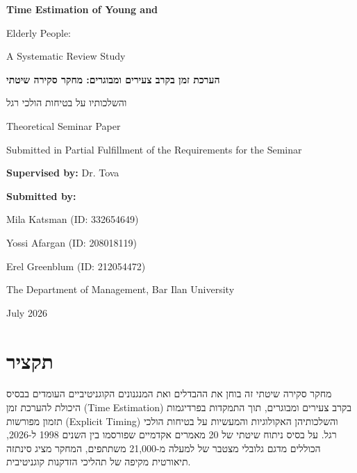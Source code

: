 \documentclass{custom_report}
\begin{document}
\begin{titlepage}
    \centering
    \vspace*{1.5cm}
    {\Huge\bfseries Time Estimation of Young and\par Elderly People:\par A Systematic Review Study\par}
    \vspace{0.8cm}
    {\Large\bfseries{} הערכת זמן בקרב צעירים ומבוגרים: מחקר סקירה שיטתי\par והשלכותיו על בטיחות הולכי רגל\par}
    \vspace{1.5cm}
    {\large Theoretical Seminar Paper\par}
    {\large Submitted in Partial Fulfillment of the Requirements for the Seminar\par}
    \vspace{1.0cm}
    {\large \textbf{Supervised by:} Dr. Tova\par}
    \vfill
    {\large \textbf{Submitted by:}\par}
    \vspace{0.5cm}
    {\large Mila Katsman (ID: 332654649)\par}
    {\large Yossi Afargan (ID: 208018119)\par}
    {\large Erel Greenblum (ID: 212054472)\par}
    \vspace{1.5cm}
    {\large The Department of Management, Bar Ilan University\par}
    {\large July 2026\par}
\end{titlepage}

\newpage
{}

\chapter*{תקציר}
מחקר סקירה שיטתי זה בוחן את ההבדלים ואת המנגנונים הקוגניטיביים העומדים בבסיס היכולת להערכת זמן (Time Estimation) בקרב צעירים ומבוגרים, תוך התמקדות בפרדיגמות תזמון מפורשות (Explicit Timing) והשלכותיהן האקולוגיות והמעשיות על בטיחות הולכי רגל. על בסיס ניתוח שיטתי של 20 מאמרים אקדמיים שפורסמו בין השנים 1998 ל-2026, הכוללים מדגם גלובלי מצטבר של למעלה מ-21,000 משתתפים, המחקר מציג סינתזה תיאורטית מקיפה של תהליכי הזדקנות קוגניטיבית.
\end{document}
